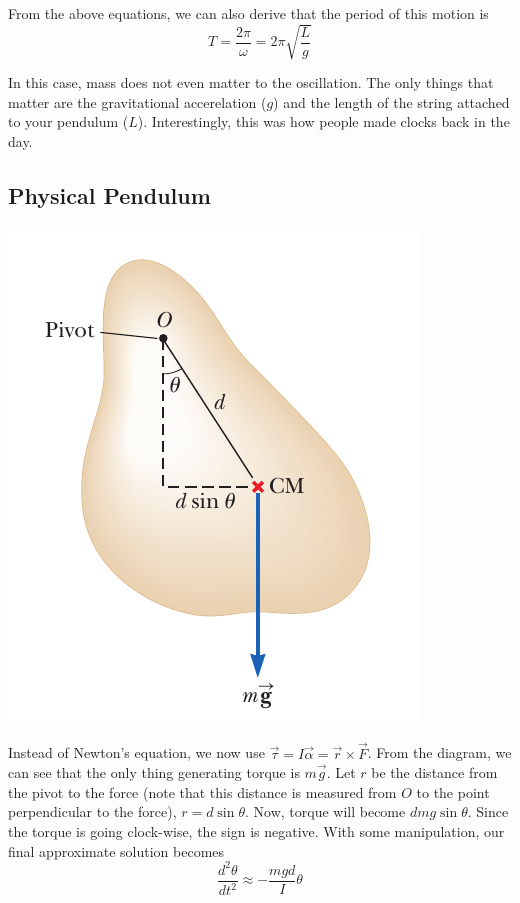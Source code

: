 From the above equations, we can also derive that the period of this motion is
\begin{equation}
    T = \frac{2\pi}{\omega} = 2\pi\sqrt{\frac{L}{g}}
\end{equation}

In this case, mass does not even matter to the oscillation. The only things that matter are the 
gravitational accerelation ($g$) and the length of the string attached to your pendulum ($L$).
Interestingly, this was how people made clocks back in the day.

\subsection{Physical Pendulum}

\begin{center}
\includegraphics[scale=0.5]{images/oaw/rotation01.png}
\end{center}

Instead of Newton's equation, we now use $\vec{\tau} = I\vec{\alpha} = \vec{r}\times\vec{F}$.
From the diagram, we can see that the only thing generating torque is $m\vec{g}$. Let $r$ be the
distance from the pivot to the force (note that this distance is measured from $O$ to the point
perpendicular to the force), $r = d\sin\theta$. Now, torque will become $dmg\sin\theta$. Since
the torque is going clock-wise, the sign is negative. With some manipulation, our final 
approximate solution becomes
\[ \frac{d^2\theta}{dt^2} \approx -\frac{mgd}{I}\theta \]

